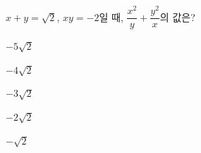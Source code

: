 $x+y=\sqrt{2}$, $xy=-2$일 때, $\dfrac{x^2}{y}+\dfrac{y^2}{x}$의 값은?
\begin{choices32}{\rule[-3ex]{0pt}{8ex}$-5\sqrt{2}$}{\rule[-3ex]{0pt}{8ex}$-4\sqrt{2}$}{\rule[-3ex]{0pt}{8ex}$-3\sqrt{2}$}{\rule[-3ex]{0pt}{8ex}$-2\sqrt{2}$}{\rule[-3ex]{0pt}{8ex}$-\sqrt{2}$}\end{choices32}
